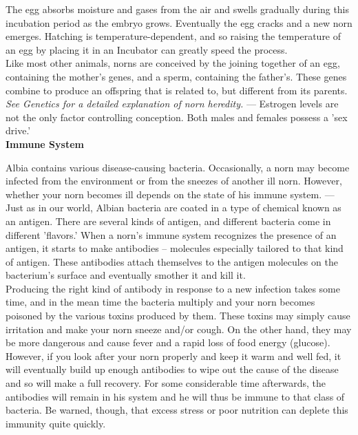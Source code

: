 \documentclass[11pt,twoside,a4paper]{article}
\begin{document}
The egg absorbs moisture and gases from the air and swells gradually during this incubation period as the embryo grows. Eventually the egg cracks and a new norn emerges. Hatching is temperature-dependent, and so raising the temperature of an egg by placing it in an Incubator can greatly speed the process. ~\\

Like most other animals, norns are conceived by the joining together of an egg, containing the mother's genes, and a sperm, containing the father's. These genes combine to produce an offspring that is related to, but different from its parents.  \emph{See Genetics for a detailed explanation of norn heredity. } --- Estrogen levels are not the only factor controlling conception. Both males and females possess a 'sex drive.' ~\\

\textbf{Immune System} %

Albia contains various disease-causing bacteria. Occasionally, a norn may become infected from the environment or from the sneezes of another ill norn. However, whether your norn becomes ill depends on the state of his immune system. --- Just as in our world, Albian bacteria are coated in a type of chemical known as an antigen. There are several kinds of antigen, and different bacteria come in different 'flavors.' When a norn's immune system recognizes the presence of an antigen, it starts to make antibodies -- molecules especially tailored to that kind of antigen. These antibodies attach themselves to the antigen molecules on the bacterium's surface and eventually smother it and kill it. ~\\

Producing the right kind of antibody in response to a new infection takes some time, and in the mean time the bacteria multiply and your norn becomes poisoned by the various toxins produced by them. These toxins may simply cause irritation and make your norn sneeze and/or cough. On the other hand, they may be more dangerous and cause fever and a rapid loss of food energy (glucose). ~\\

However, if you look after your norn properly and keep it warm and well fed, it will eventually build up enough antibodies to wipe out the cause of the disease and so will make a full recovery. For some considerable time afterwards, the antibodies will remain in his system and he will thus be immune to that class of bacteria. Be warned, though, that excess stress or poor nutrition can deplete this immunity quite quickly. ~\\
\end{document}

